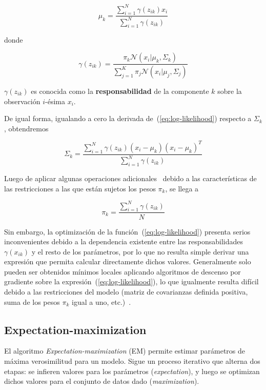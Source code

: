 \begin{equation}
    \label{eq:mu_k}
    \mu_k = \frac{\sum_{i=1}^{N}{\gamma(z_{ik})x_i}}{\sum_{i=1}^{N}{\gamma(z_{ik})}}
\end{equation}

\noindent
donde

\begin{equation}
    \label{eq:gamma}
    \gamma(z_{ik}) = \frac{\pi_k \mathcal{N}(x_i|\mu_k,\Sigma_k)}{\sum_{j=1}^{K}{\pi_j \mathcal{N}(x_i|\mu_j,\Sigma_j)}}
\end{equation}

$\gamma(z_{ik})$ es conocida como la \textbf{responsabilidad} de la componente $k$ sobre la observación $i$-ésima $x_i$.

De igual forma, igualando a cero la derivada de~(\ref{eq:log-likelihood}) respecto a $\Sigma_k$, obtendremos

\begin{equation}
    \label{eq:Sigma_k}
    \Sigma_k = \frac{\sum_{i=1}^{N}{\gamma(z_{ik})(x_i-\mu_k)(x_i-\mu_k)^T}}{\sum_{i=1}^{N}{\gamma(z_{ik})}}
\end{equation}

Luego de aplicar algunas operaciones adicionales~\cite{Aggarawal13} debido a las características de las restricciones a las que están sujetos los pesos $\pi_k$, se llega a

\begin{equation}
    \label{eq:pi_k}
    \pi_k = \frac{\sum_{i=1}^{N}{\gamma(z_{ik})}}{N}
\end{equation}

Sin embargo, la optimización de la función~(\ref{eq:log-likelihood}) presenta serios inconvenientes debido a la dependencia existente entre las responsabilidades $\gamma(x_{ik})$ y el resto de los parámetros, por lo que no resulta simple derivar una expresión que permita calcular directamente dichos valores.
Generalmente solo pueden ser obtenidos mínimos locales aplicando algoritmos de descenso por gradiente sobre la expresión~(\ref{eq:log-likelihood}), lo que igualmente resulta difícil debido a las restricciones del modelo (matriz de covarianzas definida positiva, suma de los pesos $\pi_k$ igual a uno, etc.)~\cite{Aggarawal13,Murphy12}.

\subsection{Expectation-maximization}\label{subsec:EM}

El algoritmo \textit{Expectation-maximization} (EM) permite estimar parámetros de máxima verosimilitud para un modelo.
Sigue un proceso iterativo que alterna dos etapas: se infieren valores para los parámetros (\textit{expectation}), y luego se optimizan dichos valores para el conjunto de datos dado (\textit{maximization}).

